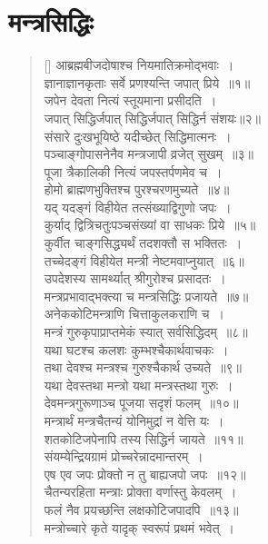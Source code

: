 \documentclass[twoside,12pt,notitlepage]{book}
\begin{document}
\section{मन्त्रसिद्धिः}
\begin{verse}[\versewidth]
आब्रह्मबीजदोषाश्च नियमातिक्रमोद्भवाः~।\\[-6pt]
ज्ञानाज्ञानकृताः सर्वे प्रणश्यन्ति जपात् प्रिये~॥१॥\\
जपेन देवता नित्यं स्तूयमाना प्रसीदति~।\\[-6pt]
जपात् सिद्धिर्जपात् सिद्धिर्जपात् सिद्धिर्न संशयः॥२॥\\
संसारे दुःखभूयिष्ठे यदीच्छेत् सिद्धिमात्मनः~।\\[-6pt]
पञ्चाङ्गोपासनेनैव मन्त्रजापी व्रजेत् सुखम्~॥३॥\\ 
पूजा त्रैकालिकी नित्यं जपस्तर्पणमेव च~।\\[-6pt]
होमो ब्राह्मणभुक्तिश्च पुरश्चरणमुच्यते~॥४॥\\
यद् यदङ्गं विहीयेत तत्संख्याद्विगुणो जपः~।\\[-6pt]
कुर्याद् द्वित्रिचतुःपञ्चसंख्यां वा साधकः प्रिये~॥५॥\\
कुर्वीत चाङ्गसिद्ध्यर्थं तदशक्तौ स भक्तितः~।\\[-6pt]
तच्चेदङ्गं विहीयेत मन्त्री नेष्टमवाप्नुयात्~॥६॥\\
उपदेशस्य सामर्थ्यात् श्रीगुरोश्च प्रसादतः~।\\[-6pt]
मन्त्रप्रभावाद्भक्त्या च मन्त्रसिद्धिः प्रजायते~॥७॥\\
अनेककोटिमन्त्राणि चित्ताकुलकराणि च~।\\[-6pt]
मन्त्रं गुरुकृपाप्राप्तमेकं स्यात् सर्वसिद्धिदम्~॥८॥\\
यथा घटश्च कलशः कुम्भश्चैकार्थवाचकः~।\\[-6pt]
तथा देवश्च मन्त्रश्च गुरुश्चैकार्थ उच्यते~॥९॥\\
यथा देवस्तथा मन्त्रो यथा मन्त्रस्तथा गुरुः~।\\[-6pt]
देवमन्त्रगुरूणाञ्च पूजया सदृशं फलम्~॥१०॥\\
मन्त्रार्थं मन्त्रचैतन्यं योनिमुद्रां न वेत्ति यः~।\\[-6pt]
शतकोटिजपेनापि तस्य सिद्धिर्न जायते~॥११॥\\
संयम्येन्द्रियग्रामं प्रोच्चरेन्नादमान्तरम्~।\\[-6pt]
एष एव जपः प्रोक्तो न तु बाह्यजपो जपः~॥१२॥\\
चैतन्यरहिता मन्त्राः प्रोक्ता वर्णास्तु केवलम्~।\\[-6pt]
फलं नैव प्रयच्छन्ति लक्षकोटिजपादपि~॥१३॥\\
मन्त्रोच्चारे कृते यादृक् स्वरूपं प्रथमं भवेत्~।\\[-6pt]

\end{verse}
\end{document}

